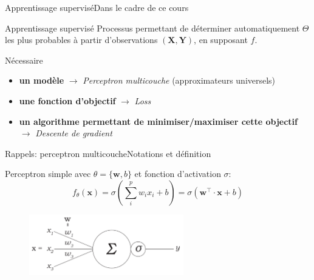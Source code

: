 \documentclass[12pt,dvipsnames,aspectratio=169]{beamer}
\newcommand{\x}[0]{\mathbf{x}}
\newcommand{\X}[0]{\mathbf{X}}
\newcommand{\Y}[0]{\mathbf{Y}}
\newcommand{\w}[0]{\mathbf{w}}
\begin{document}
\begin{frame}{Apprentissage supervisé}{Dans le cadre de ce cours}
    \begin{block}{Apprentissage supervisé}
        Processus permettant de déterminer automatiquement $\Theta$ les plus probables à partir d'observations $(\X, \Y)$, en supposant $f$.
    \end{block}
    
    \begin{block}{Nécessaire}
        \begin{itemize}
            \item \textbf{un modèle} $\rightarrow$ \textit{\alert{Perceptron multicouche}} (approximateurs universels)
            \item \textbf{une fonction d'objectif} $\rightarrow$ \textit{\alert{Loss}}
            \item \textbf{un algorithme permettant de minimiser/maximiser cette objectif} $\rightarrow$ \textit{\alert{Descente de gradient}}
        \end{itemize}
    \end{block}
\end{frame}

\begin{frame}{Rappels: perceptron multicouche}{Notations et définition}

    Perceptron simple avec $\theta = \{\w, b\}$ et fonction d'activation $\sigma$:
    \begin{equation*}
        f_\theta(\x) = \sigma(\sum_i^p w_i x_i + b) = \sigma(\w^\intercal \cdot \x + b)
    \end{equation*}

    \begin{figure}
        \centering
        \includegraphics[width=0.6\textwidth]{figures/perpcetron.pdf}
    \end{figure}

\end{frame}
\end{document}
